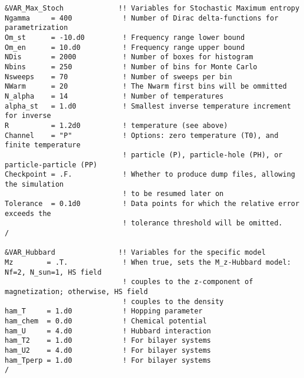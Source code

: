 \begin{lstlisting}[style=fortran,escapechar=\#,breaklines=true]
&VAR_Max_Stoch             !! Variables for Stochastic Maximum entropy
Ngamma     = 400            ! Number of Dirac delta-functions for parametrization
Om_st      = -10.d0         ! Frequency range lower bound
Om_en      = 10.d0          ! Frequency range upper bound
NDis       = 2000           ! Number of boxes for histogram
Nbins      = 250            ! Number of bins for Monte Carlo
Nsweeps    = 70             ! Number of sweeps per bin
NWarm      = 20             ! The Nwarm first bins will be ommitted
N_alpha    = 14             ! Number of temperatures
alpha_st   = 1.d0           ! Smallest inverse temperature increment for inverse
R          = 1.2d0          ! temperature (see above) 
Channel    = "P"            ! Options: zero temperature (T0), and finite temperature
                            ! particle (P), particle-hole (PH), or particle-particle (PP)
Checkpoint = .F.            ! Whether to produce dump files, allowing the simulation
                            ! to be resumed later on
Tolerance  = 0.1d0          ! Data points for which the relative error exceeds the
                            ! tolerance threshold will be omitted.
/

&VAR_Hubbard               !! Variables for the specific model
Mz        = .T.             ! When true, sets the M_z-Hubbard model: Nf=2, N_sun=1, HS field
                            ! couples to the z-component of magnetization; otherwise, HS field
                            ! couples to the density
ham_T     = 1.d0            ! Hopping parameter
ham_chem  = 0.d0            ! Chemical potential
ham_U     = 4.d0            ! Hubbard interaction
ham_T2    = 1.d0            ! For bilayer systems
ham_U2    = 4.d0            ! For bilayer systems
ham_Tperp = 1.d0            ! For bilayer systems
/
               
\end{lstlisting}
%


